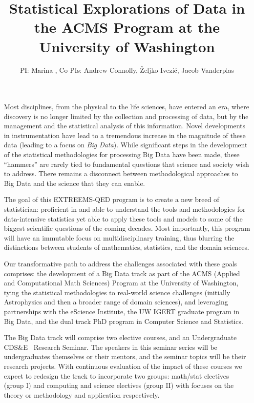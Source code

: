 \documentclass[nofootbib,floatfix,11pt]{article}
\title{Statistical Explorations of Data in the {ACMS} {Program} at the
  {University} of {Washington}}
\author{PI: Marina \meila, Co-PIs: Andrew Connolly, \v{Z}eljko Ivezi\'{c}, Jacob Vanderplas}
\newcommand{\cdse}{CDS\&E}
\begin{document}

Most disciplines, from the physical to the life sciences, have entered
an era, where discovery is no longer limited by the collection and
processing of data, but by the management and the statistical analysis
of this information. Novel developments in instrumentation have lead
to a tremendous increase in the magnitude of these data (leading to a
focus on \emph{Big Data}).  While significant steps in the development
of the statistical methodologies for processing Big Data have been
made, these ``hammers'' are rarely tied to fundamental questions that
science and society wish to address. There remains a disconnect
between methodological approaches to Big Data and the science that
they can enable.

The goal of this EXTREEMS-QED program is to create a new breed of
statistician: proficient in and able to understand the tools and
methodologies for data-intensive statistics yet able to apply these
tools and models to some of the biggest scientific questions of the
coming decades.  Most importantly, this program will have an immutable
focus on multidisciplinary training, thus blurring the distinctions
between students of mathematics, statistics, and the domain sciences.

Our transformative path to address the challenges associated with
these goals comprises: the development of a Big Data track as part of
the ACMS (Applied and Computational Math Sciences) Program at the
University of Washington, tying the statistical methodologies to
real-world science challenges (initially Astrophysics and then a
broader range of domain sciences), and leveraging partnerships with
the eScience Institute, the UW IGERT graduate program in Big Data, and
the dual track PhD program in Computer Science and Statistics. 

The Big Data track will comprise two elective courses, and an
Undergraduate \cdse~ Research Seminar. The speakers in this seminar
series will be undergraduates themselves or their mentors, and the
seminar topics will be their research projects. With continuous
evaluation of the impact of these courses we expect to redesign the
track to incorporate two groups: math/stat electives (group I) and
computing and science electives (group II) with focuses on the theory
or methodology and application respectively.
\end{document}
